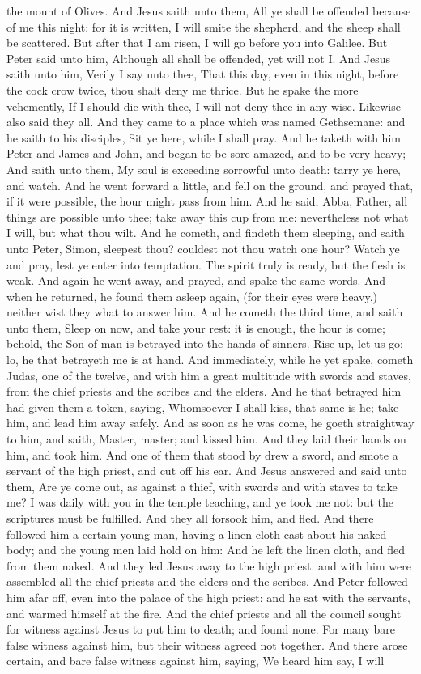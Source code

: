 the mount of Olives. And Jesus saith unto them, All ye shall be offended because of me this night: for it is written, I will smite the shepherd, and the sheep shall be scattered. But after that I am risen, I will go before you into Galilee. But Peter said unto him, Although all shall be offended, yet will not I. And Jesus saith unto him, Verily I say unto thee, That this day, even in this night, before the cock crow twice, thou shalt deny me thrice. But he spake the more vehemently, If I should die with thee, I will not deny thee in any wise. Likewise also said they all. And they came to a place which was named Gethsemane: and he saith to his disciples, Sit ye here, while I shall pray. And he taketh with him Peter and James and John, and began to be sore amazed, and to be very heavy; And saith unto them, My soul is exceeding sorrowful unto death: tarry ye here, and watch. And he went forward a little, and fell on the ground, and prayed that, if it were possible, the hour might pass from him. And he said, Abba, Father, all things are possible unto thee; take away this cup from me: nevertheless not what I will, but what thou wilt. And he cometh, and findeth them sleeping, and saith unto Peter, Simon, sleepest thou? couldest not thou watch one hour? Watch ye and pray, lest ye enter into temptation. The spirit truly is ready, but the flesh is weak. And again he went away, and prayed, and spake the same words. And when he returned, he found them asleep again, (for their eyes were heavy,) neither wist they what to answer him. And he cometh the third time, and saith unto them, Sleep on now, and take your rest: it is enough, the hour is come; behold, the Son of man is betrayed into the hands of sinners. Rise up, let us go; lo, he that betrayeth me is at hand. And immediately, while he yet spake, cometh Judas, one of the twelve, and with him a great multitude with swords and staves, from the chief priests and the scribes and the elders. And he that betrayed him had given them a token, saying, Whomsoever I shall kiss, that same is he; take him, and lead him away safely. And as soon as he was come, he goeth straightway to him, and saith, Master, master; and kissed him. And they laid their hands on him, and took him. And one of them that stood by drew a sword, and smote a servant of the high priest, and cut off his ear. And Jesus answered and said unto them, Are ye come out, as against a thief, with swords and with staves to take me? I was daily with you in the temple teaching, and ye took me not: but the scriptures must be fulfilled. And they all forsook him, and fled. And there followed him a certain young man, having a linen cloth cast about his naked body; and the young men laid hold on him: And he left the linen cloth, and fled from them naked. And they led Jesus away to the high priest: and with him were assembled all the chief priests and the elders and the scribes. And Peter followed him afar off, even into the palace of the high priest: and he sat with the servants, and warmed himself at the fire. And the chief priests and all the council sought for witness against Jesus to put him to death; and found none. For many bare false witness against him, but their witness agreed not together. And there arose certain, and bare false witness against him, saying, We heard him say, I will 